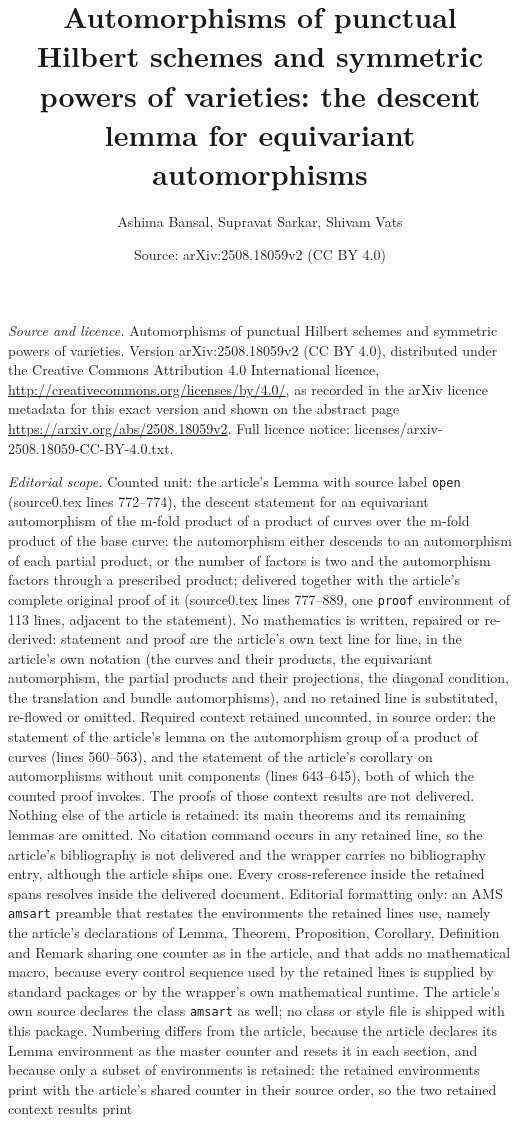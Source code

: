 \documentclass[10pt,a4paper]{amsart}
\title[Automorphisms of Hilbert schemes]{Automorphisms of punctual Hilbert schemes and symmetric powers of varieties: the descent lemma for equivariant automorphisms}
\author{Ashima Bansal, Supravat Sarkar, Shivam Vats}
\date{Source: arXiv:2508.18059v2 (CC BY 4.0)}
\theoremstyle{plain}
\theoremstyle{definition}
\theoremstyle{remark}
\begin{document}
\maketitle
\noindent\emph{Source and licence.} Automorphisms of punctual Hilbert schemes and symmetric powers of varieties. Version arXiv:2508.18059v2 (CC BY 4.0), distributed under the Creative Commons Attribution 4.0 International licence, \url{http://creativecommons.org/licenses/by/4.0/}, as recorded in the arXiv licence metadata for this exact version and shown on the abstract page \url{https://arxiv.org/abs/2508.18059v2}. Full licence notice: licenses/arxiv-2508.18059-CC-BY-4.0.txt.\par\smallskip

\noindent\textit{Editorial scope.} Counted unit: the article's Lemma with source label \texttt{open} (source0.tex lines 772--774), the descent statement for an equivariant automorphism of the m-fold product of a product of curves over the m-fold product of the base curve: the automorphism either descends to an automorphism of each partial product, or the number of factors is two and the automorphism factors through a prescribed product; delivered together with the article's complete original proof of it (source0.tex lines 777--889, one \texttt{proof} environment of 113 lines, adjacent to the statement). No mathematics is written, repaired or re-derived: statement and proof are the article's own text line for line, in the article's own notation (the curves and their products, the equivariant automorphism, the partial products and their projections, the diagonal condition, the translation and bundle automorphisms), and no retained line is substituted, re-flowed or omitted. Required context retained uncounted, in source order: the statement of the article's lemma on the automorphism group of a product of curves (lines 560--563), and the statement of the article's corollary on automorphisms without unit components (lines 643--645), both of which the counted proof invokes. The proofs of those context results are not delivered. Nothing else of the article is retained: its main theorems and its remaining lemmas are omitted. No citation command occurs in any retained line, so the article's bibliography is not delivered and the wrapper carries no bibliography entry, although the article ships one. Every cross-reference inside the retained spans resolves inside the delivered document. Editorial formatting only: an AMS \texttt{amsart} preamble that restates the environments the retained lines use, namely the article's declarations of Lemma, Theorem, Proposition, Corollary, Definition and Remark sharing one counter as in the article, and that adds no mathematical macro, because every control sequence used by the retained lines is supplied by standard packages or by the wrapper's own mathematical runtime. The article's own source declares the class \texttt{amsart} as well; no class or style file is shipped with this package. Numbering differs from the article, because the article declares its Lemma environment as the master counter and resets it in each section, and because only a subset of environments is retained: the retained environments print with the article's shared counter in their source order, so the two retained context results print 
\end{document}
